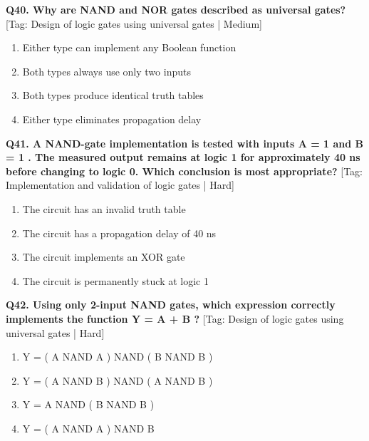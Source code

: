 \noindent\textbf{Q40. Why are NAND and NOR gates described as universal gates?} \hfill [Tag: Design of logic gates using universal gates | Medium]
\begin{enumerate}[label=(\alph*),topsep=2pt,itemsep=1pt,partopsep=0pt,parsep=0pt]
    \item {Either type can implement any Boolean function}
    \item {Both types always use only two inputs}
    \item {Both types produce identical truth tables}
    \item {Either type eliminates propagation delay}
\end{enumerate}
\vspace{2mm}

\noindent\textbf{Q41. A NAND-gate implementation is tested with inputs A = 1 and B = 1 . The measured output remains at logic 1 for approximately 40 ns before changing to logic 0. Which conclusion is most appropriate?} \hfill [Tag: Implementation and validation of logic gates | Hard]
\begin{enumerate}[label=(\alph*),topsep=2pt,itemsep=1pt,partopsep=0pt,parsep=0pt]
    \item {The circuit has an invalid truth table}
    \item {The circuit has a propagation delay of 40 ns}
    \item {The circuit implements an XOR gate}
    \item {The circuit is permanently stuck at logic 1}
\end{enumerate}
\vspace{2mm}

\noindent\textbf{Q42. Using only 2-input NAND gates, which expression correctly implements the function Y = A + B ?} \hfill [Tag: Design of logic gates using universal gates | Hard]
\begin{enumerate}[label=(\alph*),topsep=2pt,itemsep=1pt,partopsep=0pt,parsep=0pt]
    \item {Y = ( A NAND A ) NAND ( B NAND B )}
    \item {Y = ( A NAND B ) NAND ( A NAND B )}
    \item {Y = A NAND ( B NAND B )}
    \item {Y = ( A NAND A ) NAND B}
\end{enumerate}
\vspace{2mm}

